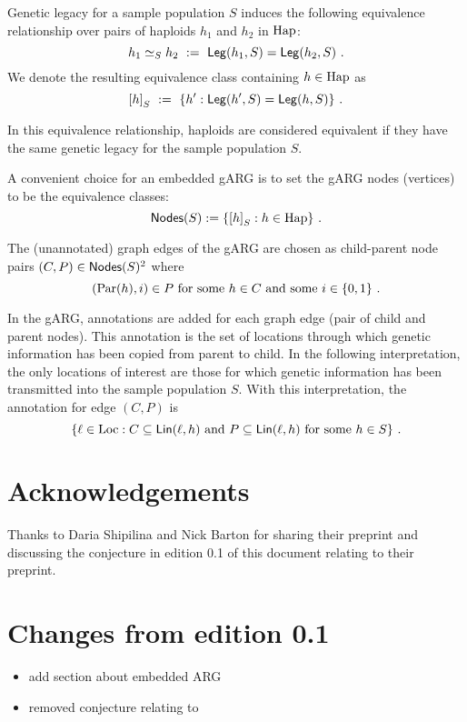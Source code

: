 \documentclass{article}
\begin{document}
Genetic legacy for a sample population $S$ induces the following
equivalence relationship over pairs of haploids $h_1$ and $h_2$ in
$\mathrm{Hap}$:
$$
h_1 \simeq_S h_2 \ := \ \mathsf{Leg}(h_1, S) = \mathsf{Leg}(h_2, S)
\text{ .}
$$
We denote the resulting equivalence class containing $h \in \mathrm{Hap}$ as
$$
{[h]}_S \ := \ \{ h' : \mathsf{Leg}(h', S) = \mathsf{Leg}(h, S) \}
\text{ .}
$$

In this equivalence relationship, haploids are considered equivalent if
they have the same genetic legacy for the sample population $S$.

A convenient choice for an embedded gARG \cite{wong_what_arg_2022} is
to set the gARG nodes (vertices) to be the equivalence classes:
$$
   \mathsf{Nodes}(S) := \{ {[h]}_S : h \in \mathrm{Hap} \}
\text{ .}
$$

The (unannotated) graph edges of the gARG are chosen as child-parent
node pairs $(C, P) \in \mathsf{Nodes}(S)^2$ where
$$
  (\mathrm{Par}(h), i) \in P \text{ for some $h \in C$ and some $i \in \{0, 1\}$ .}
$$

In the gARG, annotations are added for each graph edge (pair of child
and parent nodes). This annotation is the set of locations through which
genetic information has been copied from parent to child. In the
following interpretation, the only locations of interest are those for
which genetic information has been transmitted into the sample
population $S$. With this interpretation, the annotation for edge
$(C,P)$ is
$$
  \{ \ell \in \mathrm{Loc} :
     C \subseteq \mathsf{Lin}(\ell, h) \text{ and } P \subseteq \mathsf{Lin}(\ell, h) \text{ for some $h \in S$}
  \}
\text{ .}
$$

\section{Acknowledgements}

Thanks to Daria Shipilina and Nick Barton for sharing their preprint
\cite{shipilina_origin_2022} and discussing the conjecture in edition
0.1 of this document relating to their preprint.

\section{Changes from edition 0.1}

\begin{itemize}
\item
  add section about embedded ARG
\item
  removed conjecture relating to \cite{shipilina_origin_2022}
\end{itemize}


\printbibliography
\end{document}
